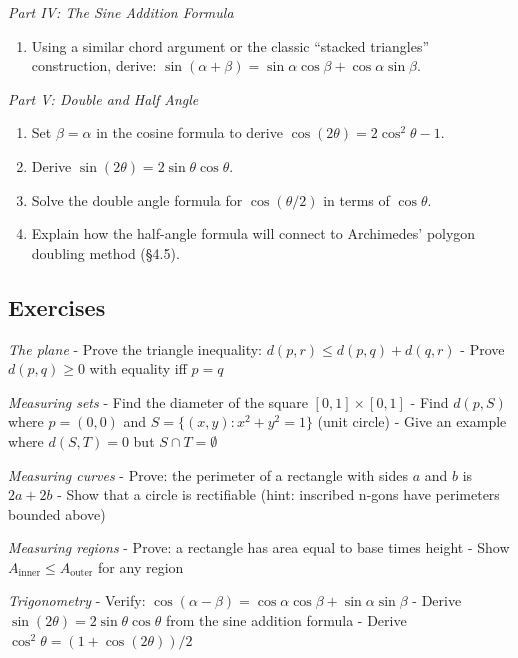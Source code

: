 \documentclass[
  10pt,
  letterpaper,
]{scrbook}
\providecommand{\tightlist}{%
  \setlength{\itemsep}{0pt}\setlength{\parskip}{0pt}}
\begin{document}
\emph{Part IV: The Sine Addition Formula}

\begin{enumerate}
\def\labelenumi{(\alph{enumi})}
\setcounter{enumi}{10}
\tightlist
\item
  Using a similar chord argument or the classic ``stacked triangles''
  construction, derive:
  \(\sin(\alpha + \beta) = \sin\alpha\cos\beta + \cos\alpha\sin\beta\).
\end{enumerate}

\emph{Part V: Double and Half Angle}

\begin{enumerate}
\def\labelenumi{(\alph{enumi})}
\setcounter{enumi}{11}
\item
  Set \(\beta = \alpha\) in the cosine formula to derive
  \(\cos(2\theta) = 2\cos^2\theta - 1\).
\item
  Derive \(\sin(2\theta) = 2\sin\theta\cos\theta\).
\item
  Solve the double angle formula for \(\cos(\theta/2)\) in terms of
  \(\cos\theta\).
\item
  Explain how the half-angle formula will connect to Archimedes' polygon
  doubling method (§4.5).
\end{enumerate}

\subsection{Exercises}\label{exercises-4}

\emph{The plane} - Prove the triangle inequality:
\(d(p, r) \leq d(p, q) + d(q, r)\) - Prove \(d(p, q) \geq 0\) with
equality iff \(p = q\)

\emph{Measuring sets} - Find the diameter of the square
\([0, 1] \times [0, 1]\) - Find \(d(p, S)\) where \(p = (0, 0)\) and
\(S = \{(x, y) : x^2 + y^2 = 1\}\) (unit circle) - Give an example where
\(d(S, T) = 0\) but \(S \cap T = \emptyset\)

\emph{Measuring curves} - Prove: the perimeter of a rectangle with sides
\(a\) and \(b\) is \(2a + 2b\) - Show that a circle is rectifiable
(hint: inscribed n-gons have perimeters bounded above)

\emph{Measuring regions} - Prove: a rectangle has area equal to base
times height - Show \(A_{\text{inner}} \leq A_{\text{outer}}\) for any
region

\emph{Trigonometry} - Verify:
\(\cos(\alpha - \beta) = \cos\alpha\cos\beta + \sin\alpha\sin\beta\) -
Derive \(\sin(2\theta) = 2\sin\theta\cos\theta\) from the sine addition
formula - Derive \(\cos^2\theta = (1 + \cos(2\theta))/2\)
\end{document}
